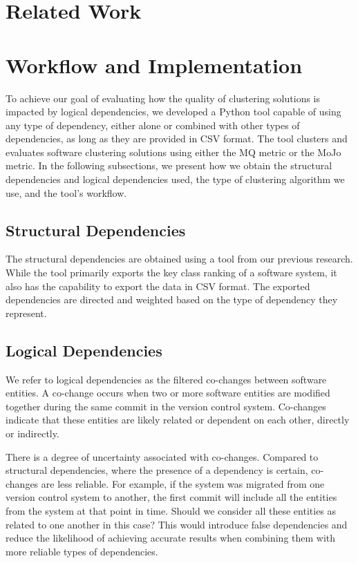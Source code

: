 \documentclass{ieeeaccess}
\begin{document}
\section{Related Work}
\label{sec:related_work}


\section{Workflow and Implementation}
\label{sec:workflow_implementation}


To achieve our goal of evaluating how the quality of clustering solutions is impacted by logical dependencies, we developed a Python tool capable of using any type of dependency, either alone or combined with other types of dependencies, as long as they are provided in CSV format. The tool clusters and evaluates software clustering solutions using either the MQ metric or the MoJo metric. In the following subsections, we present how we obtain the structural dependencies and logical dependencies used, the type of clustering algorithm we use, and the tool's workflow.

\subsection{Structural Dependencies}
\label{subsec:sd}

The structural dependencies are obtained using a tool from our previous research. While the tool primarily exports the key class ranking of a software system, it also has the capability to export the data in CSV format. The exported dependencies are directed and weighted based on the type of dependency they represent.

\subsection{Logical Dependencies}
\label{subsec:ld}

We refer to logical dependencies as the filtered co-changes between software entities. A co-change occurs when two or more software entities are modified together during the same commit in the version control system. Co-changes indicate that these entities are likely related or dependent on each other, directly or indirectly.

There is a degree of uncertainty associated with co-changes. Compared to structural dependencies, where the presence of a dependency is certain, co-changes are less reliable. For example, if the system was migrated from one version control system to another, the first commit will include all the entities from the system at that point in time. Should we consider all these entities as related to one another in this case? This would introduce false dependencies and reduce the likelihood of achieving accurate results when combining them with more reliable types of dependencies.
\end{document}
